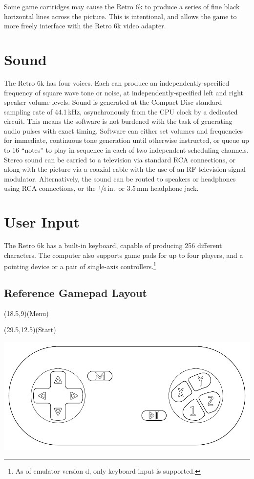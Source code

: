 \documentclass[12pt]{{memoir}}
\begin{document}
Some game cartridges may cause the Retro 6k to produce a series of fine black horizontal lines across the picture. This is intentional, and allows the game to more freely interface with the Retro 6k video adapter. 

\section{Sound}

The Retro 6k has four voices. Each can produce an independently-specified frequency of square wave tone or noise, at independently-specified left and right speaker volume levels. Sound is generated at the Compact Disc standard sampling rate of 44.1\,kHz, asynchronously from the CPU clock by a dedicated circuit. This means the software is not burdened with the task of generating audio pulses with exact timing. Software can either set volumes and frequencies for immediate, continuous tone generation until otherwise instructed, or queue up to 16 ``notes'' to play in sequence in each of two independent scheduling channels. Stereo sound can be carried to a television via standard RCA connections, or along with the picture via a coaxial cable with the use of an RF television signal modulator. Alternatively, the sound can be routed to speakers or headphones using RCA connections, or the $\sfrac{1}{4}$\,in.\ or 3.5\,mm headphone jack.

\section{User Input}

The Retro 6k has a built-in keyboard, capable of producing 256 different characters. The computer also supports game pads for up to four players, and a pointing device or a pair of single-axis controllers.\footnote{As of emulator version d, only keyboard input is supported.}

\subsection{Reference Gamepad Layout}

\setlength\TPHorizModule{.125in}
\setlength\TPVertModule{.125in}
\begin{center}
\begin{textblock}{8}(18.5,9)\textsf{(Menu)}\end{textblock}
\begin{textblock}{8}(29.5,12.5)\textsf{(Start)}\end{textblock}
\includegraphics{gamepad}
\end{center}
\end{document}
